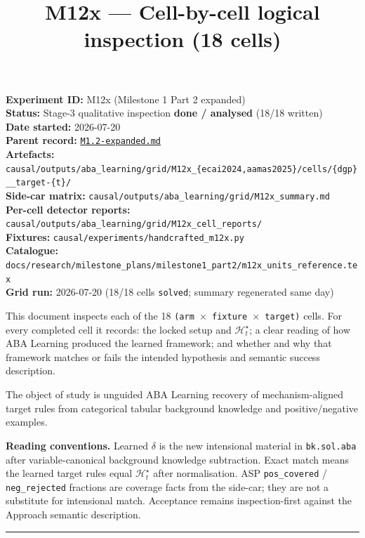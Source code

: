 \documentclass[11pt]{article}
\title{M12x --- Cell-by-cell logical inspection (18 cells)}
\author{}
\date{}
\begin{document}
\maketitle

\textbf{Experiment ID:} M12x (Milestone 1 Part 2 expanded)\\
\textbf{Status:} Stage-3 qualitative inspection \textbf{done / analysed} (18/18 written)\\
\textbf{Date started:} 2026-07-20\\
\textbf{Parent record:} \href{M1.2-expanded.md}{\texttt{M1.2-expanded.md}}\\
\textbf{Artefacts:} \texttt{causal/outputs/aba\_learning/grid/M12x\_\{ecai2024,aamas2025\}/cells/\{dgp\}\_\_target-\{t\}/}\\
\textbf{Side-car matrix:} \texttt{causal/outputs/aba\_learning/grid/M12x\_summary.md}\\
\textbf{Per-cell detector reports:} \texttt{causal/outputs/aba\_learning/grid/M12x\_cell\_reports/}\\
\textbf{Fixtures:} \texttt{causal/experiments/handcrafted\_m12x.py}\\
\textbf{Catalogue:} \texttt{docs/research/milestone\_plans/milestone1\_part2/m12x\_units\_reference.tex}\\
\textbf{Grid run:} 2026-07-20 (18/18 cells \texttt{solved}; summary regenerated same day)

This document inspects each of the 18 \texttt{(arm \(\times\) fixture \(\times\) target)} cells. For every completed cell it records: the locked setup and \(\mathcal{H}_t^\star\); a clear reading of how ABA Learning produced the learned framework; and whether and why that framework matches or fails the intended hypothesis and semantic success description.

The object of study is unguided ABA Learning recovery of mechanism-aligned target rules from categorical tabular background knowledge and positive/negative examples.

\textbf{Reading conventions.} Learned \(\delta\) is the new intensional material in \texttt{bk.sol.aba} after variable-canonical background knowledge subtraction. Exact match means the learned target rules equal \(\mathcal{H}_t^\star\) after normalisation. ASP \texttt{pos\_covered} / \texttt{neg\_rejected} fractions are coverage facts from the side-car; they are not a substitute for intensional match. Acceptance remains inspection-first against the Approach semantic description.

\medskip\hrule\medskip
\end{document}
